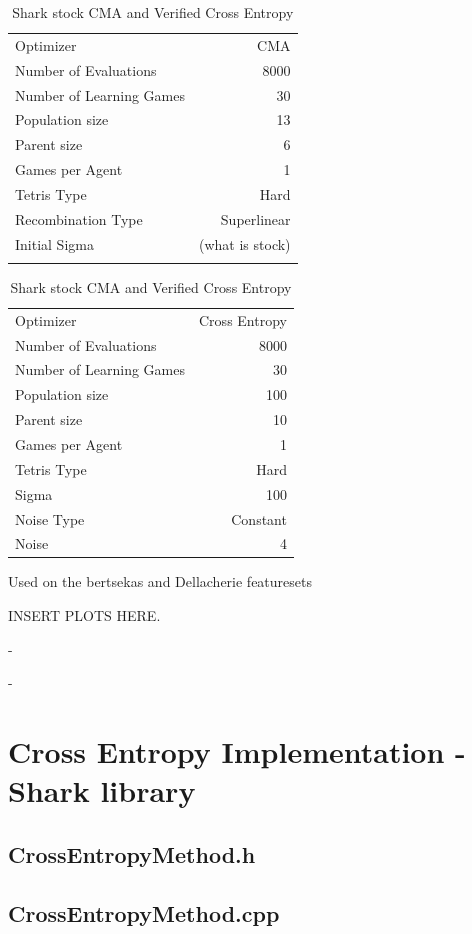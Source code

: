 \begin{table}[h]
\centering
\small
\caption{Shark stock CMA and Verified Cross Entropy}
\begin{tabular}{l r}
Optimizer & CMA\\
Number of Evaluations & 8000\\
Number of Learning Games & 30\\
Population size& 13\\
Parent size & 6\\
Games per Agent & 1\\
Tetris Type & Hard\\
\hline
Recombination Type & Superlinear\\
Initial Sigma & (what is stock)\\
\quad & \quad
\end{tabular}
\quad
\begin{tabular}{l r}
Optimizer & Cross Entropy\\
Number of Evaluations & 8000\\
Number of Learning Games & 30\\
Population size & 100\\
Parent size & 10\\
Games per Agent & 1\\
Tetris Type & Hard\\
\hline
Sigma & 100\\
Noise Type & Constant\\
Noise & 4
\end{tabular}
\end{table}

Used on the bertsekas and Dellacherie featuresets

INSERT PLOTS HERE.

 - 

 - 

\clearpage

\section{Cross Entropy Implementation - Shark library}

\subsection{CrossEntropyMethod.h}



\clearpage

\subsection{CrossEntropyMethod.cpp}


